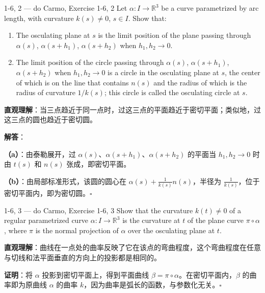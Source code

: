\begin{exercise}{1-6, 2 — do Carmo, Exercise 1-6, 2}
Let $\alpha: I \to \mathbb{R}^3$ be a curve parametrized by arc length, with curvature $k(s) \neq 0$, $s \in I$. Show that:
\begin{enumerate}
\item[a.] The osculating plane at $s$ is the limit position of the plane passing through $\alpha(s)$, $\alpha(s + h_1)$, $\alpha(s + h_2)$ when $h_1, h_2 \to 0$.
\item[b.] The limit position of the circle passing through $\alpha(s)$, $\alpha(s + h_1)$, $\alpha(s + h_2)$ when $h_1, h_2 \to 0$ is a circle in the osculating plane at $s$, the center of which is on the line that contains $n(s)$ and the radius of which is the radius of curvature $1/k(s)$; this circle is called the osculating circle at $s$.
\end{enumerate}
\end{exercise}

\begin{solution}
\textbf{直观理解}：当三点趋近于同一点时，过这三点的平面趋近于密切平面；类似地，过这三点的圆也趋近于密切圆。

\textbf{解答}：

\textbf{（a）}：由泰勒展开，过 $\alpha(s)$、$\alpha(s+h_1)$、$\alpha(s+h_2)$ 的平面当 $h_1,h_2\to 0$ 时由 $t(s)$ 和 $n(s)$ 张成，即密切平面。

\textbf{（b）}：由局部标准形式，该圆的圆心在 $\alpha(s) + \frac{1}{k(s)}n(s)$，半径为 $\frac{1}{k(s)}$，位于密切平面内，即为密切圆。$\square$
\end{solution}

\begin{exercise}{1-6, 3 — do Carmo, Exercise 1-6, 3}
Show that the curvature $k(t) \neq 0$ of a regular parametrized curve $\alpha: I \to \mathbb{R}^3$ is the curvature at $t$ of the plane curve $\pi \circ \alpha$, where $\pi$ is the normal projection of $\alpha$ over the osculating plane at $t$.
\end{exercise}

\begin{solution}
\textbf{直观理解}：曲线在一点处的曲率反映了它在该点的弯曲程度，这个弯曲程度在任意与切线和法平面垂直的方向上的投影都是相同的。

\textbf{证明}：将 $\alpha$ 投影到密切平面上，得到平面曲线 $\beta = \pi\circ\alpha$。在密切平面内，$\beta$ 的曲率即为原曲线 $\alpha$ 的曲率 $k$，因为曲率是弧长的函数，与参数化无关。$\square$
\end{solution}


